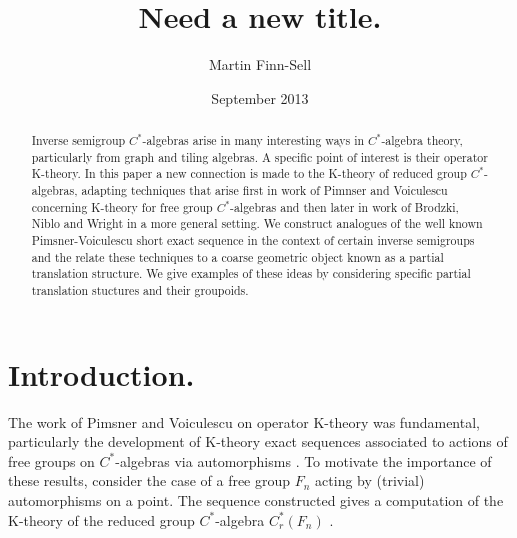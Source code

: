 \documentclass[11pt]{amsart}
\title{Need a new title.}
\date{September 2013}
\author{Martin Finn-Sell}
\theoremstyle{plain}
\theoremstyle{definition}%
\theoremstyle{remark}%
\begin{document}


\maketitle

\begin{abstract}
Inverse semigroup $C^{*}$-algebras arise in many interesting ways in $C^{*}$-algebra theory, particularly from graph and tiling algebras. A specific point of interest is their operator K-theory. In this paper a new connection is made to the K-theory of reduced group $C^{*}$-algebras, adapting techniques that arise first in work of Pimnser and Voiculescu concerning K-theory for free group $C^{*}$-algebras and then later in work of Brodzki, Niblo and Wright in a more general setting. We construct analogues of the well known Pimsner-Voiculescu short exact sequence in the context of certain inverse semigroups and the relate these techniques to a coarse geometric object known as a partial translation structure. We give examples of these ideas by considering specific partial translation stuctures and their groupoids.
\end{abstract}

\section{Introduction.}
The work of Pimsner and Voiculescu on operator K-theory was fundamental, particularly the development of K-theory exact sequences associated to actions of free groups on $C^{*}$-algebras via automorphisms \cite{MR670181,MR587369}. To motivate the importance of these results, consider the case of a free group $F_{n}$ acting by (trivial) automorphisms on a point. The sequence constructed gives a computation of the K-theory of the reduced group $C^{*}$-algebra $C^{*}_{r}(F_{n})$ \cite{MR670181}. 
\end{document}
